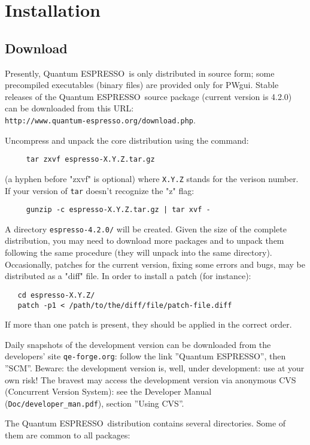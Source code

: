 \documentclass[12pt,a4paper]{article}
\def\version{4.2.0}
\def\qe{{\sc Quantum ESPRESSO}}
\begin{document}
\section{Installation}

\subsection{Download}
 
Presently, \qe\ is only distributed in source form; 
some precompiled executables (binary files) are provided only for PWgui. 
Stable releases of the \qe\ source package (current version 
is \version) can be downloaded from this URL: \\
\texttt{http://www.quantum-espresso.org/download.php}.

Uncompress and unpack the core distribution using the command:
\begin{verbatim}
     tar zxvf espresso-X.Y.Z.tar.gz
\end{verbatim}
(a hyphen before "zxvf" is optional) where \texttt{X.Y.Z} stands for the
verison number. If your version of \texttt{tar} 
doesn't recognize the "z" flag:
\begin{verbatim}
     gunzip -c espresso-X.Y.Z.tar.gz | tar xvf -
\end{verbatim}
A directory \texttt{espresso-\version/} will be created. Given the size 
of the complete distribution, you may need to download more packages
and to unpack them following the same procedure (they will unpack into 
the same directory).
Occasionally, patches for the current version, fixing some errors and bugs,
may be distributed as a "diff" file. In order to install a patch (for 
instance):
\begin{verbatim}
   cd espresso-X.Y.Z/
   patch -p1 < /path/to/the/diff/file/patch-file.diff
\end{verbatim}
If more than one patch is present, they should be applied in the correct order.

Daily snapshots of the development version can be downloaded from the
developers' site \texttt{qe-forge.org}: follow the link ''Quantum ESPRESSO'', 
then ''SCM''. Beware: the development version 
is, well, under development: use at your own risk! The bravest 
may access the development version via anonymous CVS 
(Concurrent Version System): see the Developer Manual
(\texttt{Doc/developer\_man.pdf}), section ''Using CVS''.

The \qe\ distribution contains several directories. Some of them are
common to all packages:
\end{document}
